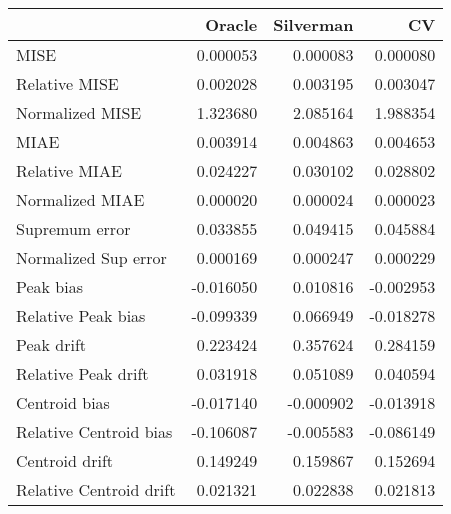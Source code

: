 \begin{tabular}{lrrr}
  \toprule
 & Oracle & Silverman & CV \\ 
  \midrule
MISE & 0.000053 & 0.000083 & 0.000080 \\ 
  Relative MISE & 0.002028 & 0.003195 & 0.003047 \\ 
  Normalized MISE & 1.323680 & 2.085164 & 1.988354 \\ 
  MIAE & 0.003914 & 0.004863 & 0.004653 \\ 
  Relative MIAE & 0.024227 & 0.030102 & 0.028802 \\ 
  Normalized MIAE & 0.000020 & 0.000024 & 0.000023 \\ 
  Supremum error & 0.033855 & 0.049415 & 0.045884 \\ 
  Normalized Sup error & 0.000169 & 0.000247 & 0.000229 \\ 
  Peak bias & -0.016050 & 0.010816 & -0.002953 \\ 
  Relative Peak bias & -0.099339 & 0.066949 & -0.018278 \\ 
  Peak drift & 0.223424 & 0.357624 & 0.284159 \\ 
  Relative Peak drift & 0.031918 & 0.051089 & 0.040594 \\ 
  Centroid bias & -0.017140 & -0.000902 & -0.013918 \\ 
  Relative Centroid bias & -0.106087 & -0.005583 & -0.086149 \\ 
  Centroid drift & 0.149249 & 0.159867 & 0.152694 \\ 
  Relative Centroid drift & 0.021321 & 0.022838 & 0.021813 \\ 
   \bottomrule
\end{tabular}
